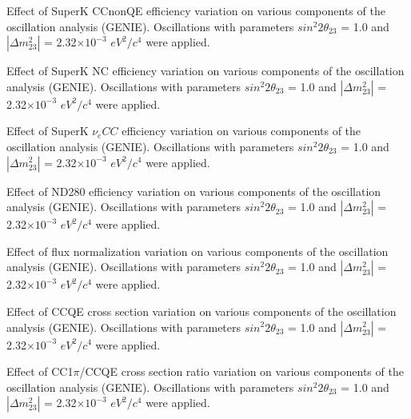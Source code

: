 %
%
%
%

\caption{ 
  Effect of SuperK CCnonQE efficiency variation
  on various components of the oscillation analysis (GENIE).
  Oscillations with parameters $sin^{2}2\theta_{23}$ = 1.0 and $|\Delta m^{2}_{23}|$ = 2.32$\times10^{-3}$ $eV^{2}/c^{4}$ were applied.  
}

%
%
%
%

\caption{ 
  Effect of SuperK NC efficiency variation
  on various components of the oscillation analysis (GENIE).
  Oscillations with parameters $sin^{2}2\theta_{23}$ = 1.0 and $|\Delta m^{2}_{23}|$ = 2.32$\times10^{-3}$ $eV^{2}/c^{4}$ were applied.  
}


%
%
%
%


\caption{ 
  Effect of SuperK $\nu_{e} CC$ efficiency variation
  on various components of the oscillation analysis (GENIE).
  Oscillations with parameters $sin^{2}2\theta_{23}$ = 1.0 and $|\Delta m^{2}_{23}|$ = 2.32$\times10^{-3}$ $eV^{2}/c^{4}$ were applied.  
}


%
%
%
%
\caption{ 
  Effect of ND280 efficiency variation
  on various components of the oscillation analysis (GENIE).
  Oscillations with parameters $sin^{2}2\theta_{23}$ = 1.0 and $|\Delta m^{2}_{23}|$ = 2.32$\times10^{-3}$ $eV^{2}/c^{4}$ were applied.  
}


%
%
%
%

\caption{ 
  Effect of flux normalization variation
  on various components of the oscillation analysis (GENIE).
  Oscillations with parameters $sin^{2}2\theta_{23}$ = 1.0 and $|\Delta m^{2}_{23}|$ = 2.32$\times10^{-3}$ $eV^{2}/c^{4}$ were applied.  
}


%
%
%
%

\caption{ 
  Effect of CCQE cross section variation
  on various components of the oscillation analysis (GENIE).
  Oscillations with parameters $sin^{2}2\theta_{23}$ = 1.0 and $|\Delta m^{2}_{23}|$ = 2.32$\times10^{-3}$ $eV^{2}/c^{4}$ were applied.  
}


%
%
%
%

\caption{ 
  Effect of CC1$\pi$/CCQE cross section ratio variation 
  on various components of the oscillation analysis (GENIE).
  Oscillations with parameters $sin^{2}2\theta_{23}$ = 1.0 and $|\Delta m^{2}_{23}|$ = 2.32$\times10^{-3}$ $eV^{2}/c^{4}$ were applied.  
}



